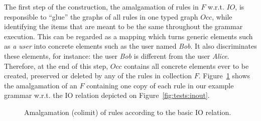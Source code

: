 The first step of the construction, the amalgamation of rules in $F$ w.r.t. $IO$, is responsible to ``glue'' the graphs of all rules in one typed graph $Occ$, while identifying the items that are meant to be the same throughout the grammar execution. This can be regarded as a mapping which turns generic elements such as \textit{a user} into concrete elements such as the user named \textit{Bob}. It also discriminates these elements, for instance: the user \textit{Bob} is different from the user
\textit{Alice}. Therefore, at the end of this step, $Occ$ contains all concrete elements ever to be created, preserved or deleted by any of the rules in collection $F$. Figure~\ref{fig:tests:amalgamation} shows the amalgamation of an $F$ containing one copy of each rule in our example grammar w.r.t. the IO relation depicted on Figure~\ref{fig:tests:inout}.

\begin{figure}[!ht]
  \centering
  \caption{Amalgamation (colimit) of rules according to the basic IO relation.}\label{fig:tests:amalgamation}
\end{figure}

